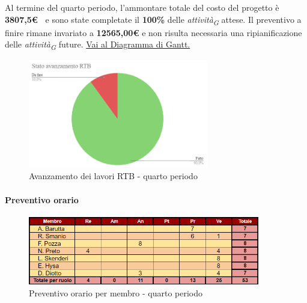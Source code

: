 \vspace{1cm}

Al termine del quarto periodo, l'ammontare totale del costo del progetto è \textbf{ 3807,5\euro\ } e sono state completate il \textbf{100\%} delle \textit{attività}\textsubscript{\textit{G}} attese.
Il preventivo a finire rimane invariato a \textbf{12565,00€} e non risulta necessaria una ripianificazione delle \textit{attività}\textsubscript{\textit{G}} future.
\href{https://github.com/orgs/ByteOps-swe/projects/3/views/1?sortedBy%5Bdirection%5D=asc&sortedBy%5BcolumnId%5D=64182560}{Vai al Diagramma di Gantt.}

\pagebreak

\begin{figure}[H]
    \centering
    \begin{minipage}[b]{0.70\textwidth}
        \centering
        \includegraphics[width=0.7\textwidth]{../Images/avanzamento4Periodo.png}
        \caption{Avanzamento dei lavori RTB - quarto periodo}
        \label{fig:Avanzamento_RTB_4}
    \end{minipage}
\end{figure}

\paragraph{Preventivo orario} 

\begin{figure}[H]
    \centering
    \includegraphics[width=0.9\textwidth]{../Images/preventivoOrario4Periodo.png}
    \caption{Preventivo orario per membro - quarto periodo}
    \label{fig:Preventivo_orario_4}
\end{figure}

